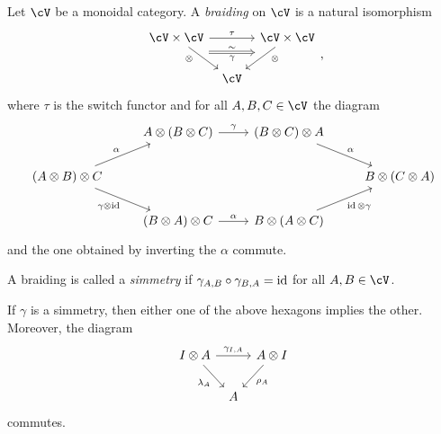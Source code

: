 \documentclass[a4paper,11pt,oneside,openany]{scrbook}
\begin{document}
\begin{defn}
    Let $\cV$ be a monoidal category. A \emph{braiding} on $\cV$ is a natural isomorphism
    \[
    \begin{tikzcd}[column sep=tiny]
        \cV\times\cV\ar[rr, "\tau"]\ar[dr, swap, near start, "\otimes", ""{name=A, anchor=center}]
        && \cV\times\cV\ar[dl, near start, "\otimes", ""{name=B, anchor=center}] \\
        & \cV
        \ar[Rightarrow, shorten <= .8em, shorten >= .8em, "\gamma"', "\sim", from=A, to=B]
    \end{tikzcd}
    ,\]
    where $\tau$ is the switch functor and for all $A,B,C\in\cV$ the diagram
    \[
    \begin{tikzcd}
    & A\otimes(B\otimes C)\ar[r, "\gamma"]
    & (B\otimes C)\otimes A\ar[dr, "\alpha"] \\
    (A\otimes B)\otimes C\ar[dr, swap, "\gamma\otimes\id"]\ar[ur, "\alpha"]
    &&& B\otimes(C\otimes A) \\
    & (B\otimes A)\otimes C\ar[r, "\alpha"]
    & B\otimes(A\otimes C)\ar[ur, swap, "\id\otimes\gamma"]
    \end{tikzcd}
    \]
    and the one obtained by inverting the $\alpha$ commute.
    
    A braiding is called a \emph{simmetry} if $\gamma_{A,B}\circ\gamma_{B,A}=\operatorname{id}$ for all $A,B\in\cV$.
\end{defn}

\begin{rmk}
    If $\gamma$ is a simmetry, then either one of the above hexagons implies the other. Moreover, the diagram
    \[
    \begin{tikzcd}[column sep=tiny]
    I\otimes A\ar[rr, "\gamma_{I,A}"]\ar[dr, swap, "\lambda_A"]
    && A\otimes I\ar[dl, "\rho_A"] \\
    & A
    \end{tikzcd}
    \]
    commutes.
\end{rmk}
\end{document}
